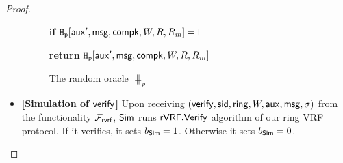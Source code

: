 \begin{proof}
\begin{itemize}
\begin{figure}
{{					
					
					
					
			
	
					\textbf{if} $ \mathtt{H_p}[\mathsf{aux}', \mathsf{msg},\mathsf{compk},W,R,R_m]  = \perp $
					
					
					
					{\textbf{return} $  \mathtt{H_p}[\mathsf{aux}',\mathsf{msg},\mathsf{compk},W,R,R_m]   $}
					
 			}}
			\caption{The random oracle $ \hash_p $}
			\label{oracle:Hout}
		\end{figure}
		
		
		
		
		\item \textbf{[Simulation of $ \mathsf{verify} $]} Upon receiving  $(\mathsf{verify}, \textsf{sid}, \mathsf{ring},W, \mathsf{aux},\mathsf{msg}, \sigma)$ from the functionality $\mathcal{F}_{\textsf{rvrf}}$, $ \mathsf{Sim} $ runs $ {\mathsf{rVRF}}.{\mathsf{Verify}} $ algorithm of our ring VRF protocol. If  it verifies, it sets $ b_{\mathsf{Sim}} =1 $. Otherwise it sets $ b_{\mathsf{Sim}} =0  $.
		

\end{itemize}
\end{proof}
